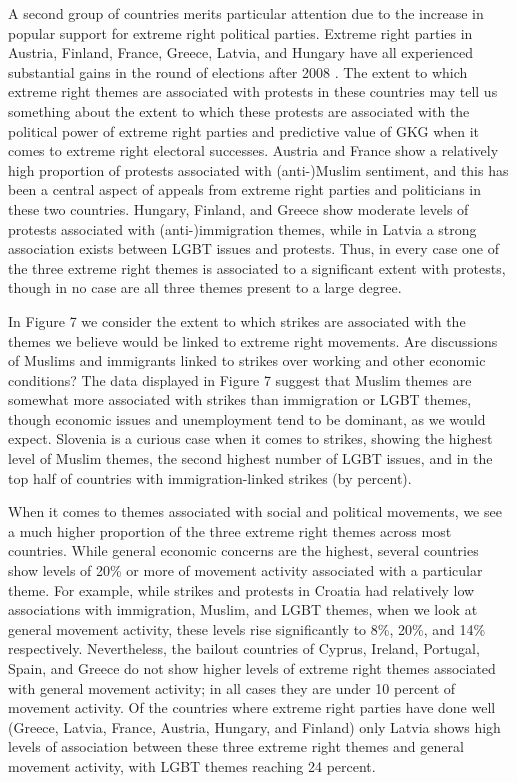 \documentclass[10pt]{article}
\begin{document}
A second group of countries merits particular attention due to the increase in popular support for extreme right political parties.  Extreme right parties in Austria, Finland, France, Greece, Latvia, and Hungary have all experienced substantial gains in the round of elections after 2008 \citep{mudde2013decades}.  The extent to which extreme right themes are associated with protests in these countries may tell us something about the extent to which these protests are associated with the political power of extreme right parties and predictive value of GKG when it comes to extreme right electoral successes.   Austria and France show a relatively high proportion of protests associated with (anti-)Muslim sentiment, and this has been a central aspect of appeals from extreme right parties and politicians in these two countries.  Hungary, Finland, and Greece show moderate levels of protests associated with (anti-)immigration themes, while in Latvia a strong association exists between LGBT issues and protests.  Thus, in every case one of the three extreme right themes is associated to a significant extent with protests, though in no case are all three themes present to a large degree.


In Figure 7 we consider the extent to which strikes are associated with the themes we believe would be linked to extreme right movements.  Are discussions of Muslims and immigrants linked to strikes over working and other economic conditions?  The data displayed in Figure 7 suggest that Muslim themes are somewhat more associated with strikes than immigration or LGBT themes, though economic issues and unemployment tend to be dominant, as we would expect. Slovenia is a curious case when it comes to strikes, showing the highest level of Muslim themes, the second highest number of LGBT issues, and in the top half of countries with immigration-linked strikes (by percent).

When it comes to themes associated with social and political movements, we see a much higher proportion of the three extreme right themes across most countries.  While general economic concerns are the highest, several countries show levels of 20\% or more of movement activity associated with a particular theme.  For example, while strikes and protests in Croatia had relatively low associations with immigration, Muslim, and LGBT themes, when we look at general movement activity, these levels rise significantly to 8\%, 20\%, and 14\% respectively.  Nevertheless, the bailout countries of Cyprus, Ireland, Portugal, Spain, and Greece do not show higher levels of extreme right themes associated with general movement activity; in all cases they are under 10 percent of movement activity.  Of the countries where extreme right parties have done well (Greece, Latvia, France, Austria, Hungary, and Finland) only Latvia shows high levels of association between these three extreme right themes and general movement activity, with LGBT themes reaching 24 percent.
\end{document}
